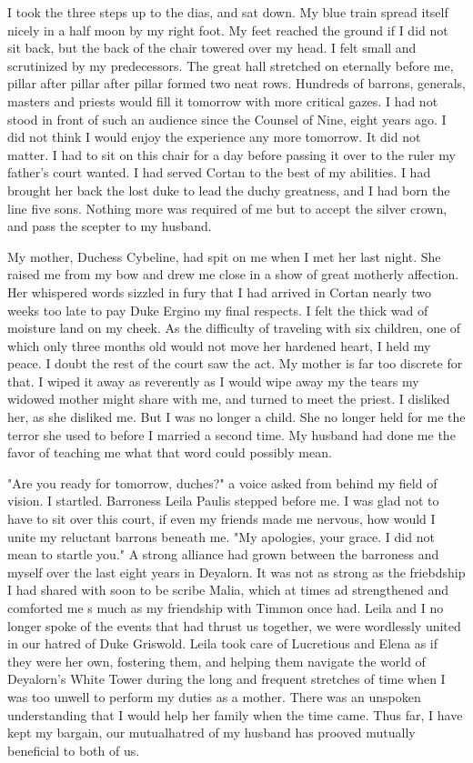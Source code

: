 \documentclass{article}
\begin{document}
I took the three steps up to the dias, and sat down. My blue train spread itself nicely in a half moon by my right foot. My feet reached the ground if I did not sit back, but the back of the chair towered over my head. I felt small and scrutinized by my predecessors. The great hall stretched on eternally before me, pillar after pillar after pillar formed two neat rows. Hundreds of barrons, generals, masters and priests would fill it tomorrow with more critical gazes. I had not stood in front of such an audience since the Counsel of Nine, eight years ago. I did not think I would enjoy the experience any more tomorrow. It did not matter. I had to sit on this chair for a day before passing it over to the ruler my father's court wanted. I had served Cortan to the best of my abilities. I had brought her back the lost duke to lead the duchy greatness, and I had born the line five sons. Nothing more was required of me but to accept the silver crown, and pass the scepter to my husband. 

My mother, Duchess Cybeline, had spit on me when I met her last night. She raised me from my bow and drew me close in a show of great motherly affection. Her whispered words sizzled in fury that I had arrived in Cortan nearly two weeks too late to pay Duke Ergino my final respects. I felt the thick wad of moisture land on my cheek. As the difficulty of traveling with six children, one of which only three months old would not move her hardened heart, I held my peace.  I doubt the rest of the court saw the act. My mother is far too discrete for that. I wiped it away as reverently as I would wipe away my the tears my widowed mother might share with me, and turned to meet the priest. I disliked her, as she disliked me. But I was no longer a child. She no longer held for me the terror she used to before I married a second time. My husband had done me the favor of teaching me what that word could possibly mean.

"Are you ready for tomorrow, duches?" a voice asked from behind my field of vision. I startled. Barroness Leila Paulis stepped before me. I was glad not to have to sit over this court, if even my friends made me nervous, how would I unite my reluctant barrons beneath me. "My apologies, your grace. I did not mean to startle you." A strong alliance had grown between the barroness and myself over the last eight years in Deyalorn. It was not as strong as the friebdship I had shared with soon to be scribe Malia, which at times ad strengthened and comforted me s much as my friendship with Timmon  once had.  Leila and I no longer spoke of the events that had thrust us together, we were wordlessly united in our hatred of Duke Griswold. Leila took care of Lucretious and Elena as if they were her own, fostering them, and helping them navigate the world of Deyalorn's White Tower during the long and frequent stretches of time when I was too unwell to perform my duties as a mother. There was an unspoken understanding that I would help her family when the time came. Thus far, I have kept my bargain, our mutualhatred of my husband has prooved mutually beneficial to both of us.
\end{document}
